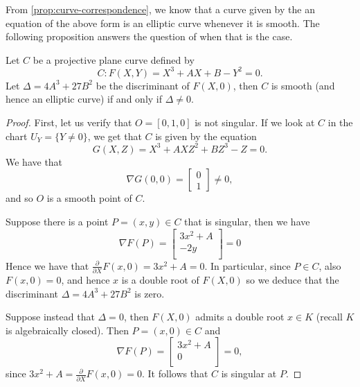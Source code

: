 From \ref{prop:curve-correspondence}, we know that a curve given by the an equation
of the above form is an elliptic curve whenever it is smooth.
The following proposition answers the question of when that is the case.
\begin{proposition}
	\label{prop:singular-determinant}
	Let $C$ be a projective plane curve defined by
	\begin{equation*}
		C: F(X, Y) = X^3 + AX + B - Y^2 = 0.
	\end{equation*}
	Let $\Delta = 4A^3 + 27B^2$ be the discriminant of $F(X, 0)$, then 
	$C$ is smooth (and hence an elliptic curve)
	if and only if $\Delta \neq 0$.
\end{proposition}
\begin{proof}
	First, let us verify that $O = [0, 1, 0]$ is not singular.
	If we look at $C$ in the chart $U_Y = \{Y \neq 0\}$, we get
	that $C$ is given by the equation
	\begin{equation*}
		G(X, Z) = X^3 + AXZ^2 + BZ^3 - Z = 0.
	\end{equation*}
	We have that
	\begin{equation*}
		\nabla G(0, 0) =
		\begin{bmatrix}
			0\\
			1
		\end{bmatrix} \neq 0,
	\end{equation*}
	and so $O$ is a smooth point of $C$.
	
	Suppose there is a point $P = (x, y) \in C$ that is singular,
	then we have
	\begin{equation*}
		\nabla F(P) =
		\begin{bmatrix}
			3x^2 + A\\
			-2y\\
		\end{bmatrix} = 0
	\end{equation*}
	Hence we have that $\frac{\partial}{\partial X}F(x, 0) 
	= 3x^2 + A = 0$.
	In particular, since $P \in C$, also 
	$F(x, 0) = 0$, and hence
	$x$ is a double root of $F(X, 0)$ so we deduce that the discriminant
	$\Delta = 4A^3 + 27B^2$ is zero.

	Suppose instead that $\Delta = 0$, then $F(X, 0)$ admits a double root
	$x \in K$ (recall $K$ is algebraically closed).
	Then $P = (x, 0) \in C$ and
	\begin{equation*}
		\nabla F(P) =
		\begin{bmatrix}
			3x^2 + A\\
			0\\
		\end{bmatrix} = 0,
	\end{equation*}
	since $3x^2 + A = \frac{\partial}{\partial X}F(x, 0) = 0$.
	It follows that $C$ is singular at $P$.
\end{proof}


